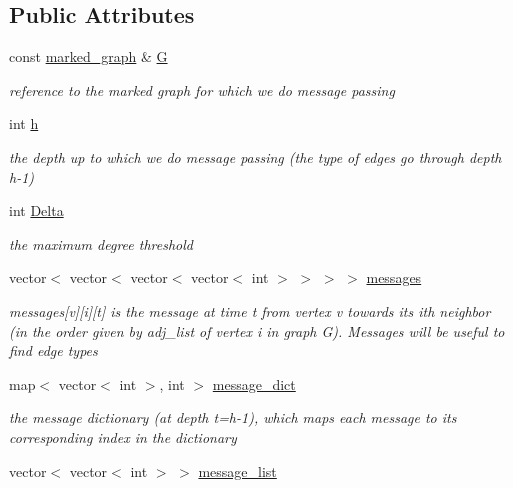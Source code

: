 \subsection*{Public Attributes}
\begin{DoxyCompactItemize}
\item 
const \hyperlink{classmarked__graph}{marked\+\_\+graph} \& \hyperlink{classgraph__message_abffce6d6a7868da0e747425569759f0f}{G}
\begin{DoxyCompactList}\small\item\em reference to the marked graph for which we do message passing \end{DoxyCompactList}\item 
int \hyperlink{classgraph__message_a934d63ed7275c211e13c6fb68824ed46}{h}
\begin{DoxyCompactList}\small\item\em the depth up to which we do message passing (the type of edges go through depth h-\/1) \end{DoxyCompactList}\item 
int \hyperlink{classgraph__message_a45dfd061b7bc73572e5132fbf66efd55}{Delta}
\begin{DoxyCompactList}\small\item\em the maximum degree threshold \end{DoxyCompactList}\item 
vector$<$ vector$<$ vector$<$ vector$<$ int $>$ $>$ $>$ $>$ \hyperlink{classgraph__message_a06a1d1ab91b4891c65ea80205566f800}{messages}
\begin{DoxyCompactList}\small\item\em messages\mbox{[}v\mbox{]}\mbox{[}i\mbox{]}\mbox{[}t\mbox{]} is the message at time t from vertex v towards its ith neighbor (in the order given by adj\+\_\+list of vertex i in graph G). Messages will be useful to find edge types \end{DoxyCompactList}\item 
map$<$ vector$<$ int $>$, int $>$ \hyperlink{classgraph__message_a7890d2dff06b9de6f98734c69d8fbcfd}{message\+\_\+dict}
\begin{DoxyCompactList}\small\item\em the message dictionary (at depth t=h-\/1), which maps each message to its corresponding index in the dictionary \end{DoxyCompactList}\item 
vector$<$ vector$<$ int $>$ $>$ \hyperlink{classgraph__message_aa497f561e976cf58cc554a77e0601d8f}{message\+\_\+list}

\end{DoxyCompactItemize}
